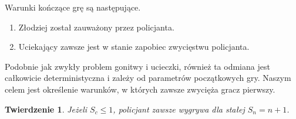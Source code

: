 \documentclass{xmgr}
\newtheorem{Twierdzenie}{Twierdzenie}
\theoremstyle{definition}
\begin{document}
\noindent Warunki kończące grę są następujące.
\begin{enumerate}
  \item Złodziej został zauważony przez policjanta.
  \item Uciekający zawsze jest w stanie zapobiec zwycięstwu policjanta.
\end{enumerate}

Podobnie jak zwykły problem gonitwy i ucieczki, również ta odmiana jest całkowicie deterministyczna i zależy od parametrów początkowych gry. Naszym celem jest określenie warunków, w których zawsze zwycięża gracz pierwszy. 

\begin{Twierdzenie} \cite{poscig}
	Jeżeli $S_c \le 1$, policjant zawsze wygrywa dla stałej $S_n = n + 1$.
\end{Twierdzenie}
\end{document}
